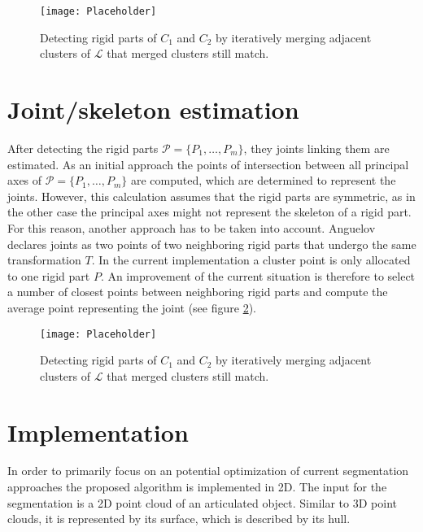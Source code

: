 \begin{figure}
	\centering
	\texttt{[image: Placeholder]}
	\caption{Detecting rigid parts of $C_1$ and $C_2$ by iteratively merging adjacent clusters of $\mathcal{L}$ that merged clusters still match.}
	\label{fig:clusterMerging}
\end{figure}

\section{Joint/skeleton estimation}

After detecting the rigid parts $\mathcal{P} =  \{ {P_1,\ldots,P_m}\}$, they joints linking them are estimated. As an initial approach the points of intersection between all principal axes of $\mathcal{P} = \{ {P_1,\ldots,P_m}\}$ are computed, which are determined to represent the joints. However, this calculation assumes that the rigid parts are symmetric, as in the other case the principal axes might not represent the skeleton of a rigid part. For this reason, another approach has to be taken into account. Anguelov \cite{Anguelov04} declares joints as two points of two neighboring rigid parts that undergo the same transformation $T$. In the current implementation a cluster point is only allocated to one rigid part $P$. An improvement of the current situation is therefore to select a number of closest points between neighboring rigid parts and compute the average point representing the joint (see figure \ref{fig:jointEstimation}). 
\begin{figure}
	\centering
	\texttt{[image: Placeholder]}
	\caption{Detecting rigid parts of $C_1$ and $C_2$ by iteratively merging adjacent clusters of $\mathcal{L}$ that merged clusters still match.}
	\label{fig:jointEstimation}
\end{figure}
\section{Implementation}
In order to primarily focus on an potential optimization of current segmentation approaches the proposed algorithm is implemented in 2D. The input for the segmentation is a 2D point cloud of an articulated object. Similar to 3D point clouds, it is represented by its surface, which is described by its hull. 

